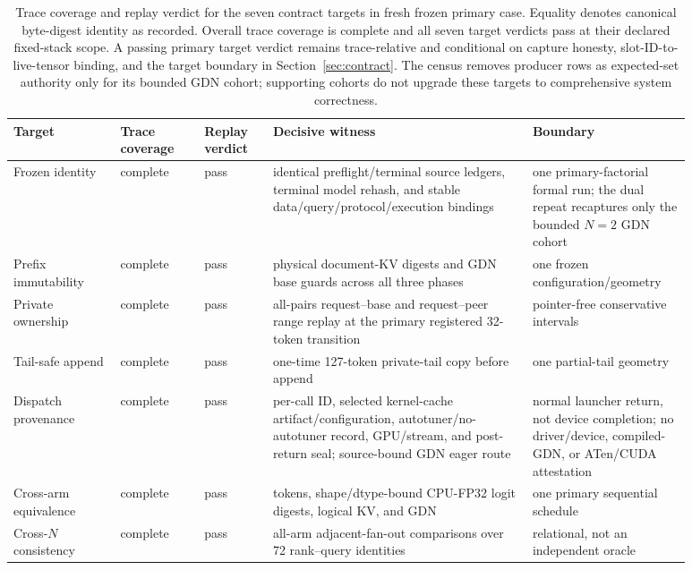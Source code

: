 \documentclass{article}
\begin{document}
\begin{table}[H]
  \caption{Trace coverage and replay verdict for the seven contract targets in
  fresh frozen primary case.  Equality denotes canonical byte-digest identity
  as recorded.  Overall trace coverage is complete and all seven target
  verdicts pass at their declared fixed-stack scope.  A passing primary
  target verdict remains trace-relative and conditional on capture honesty,
  slot-ID-to-live-tensor binding, and the target boundary in Section~\ref{sec:contract}.
  The census removes producer rows as expected-set authority only for its bounded
  GDN cohort; supporting cohorts do not upgrade these targets to comprehensive
  system correctness.}
  \label{tab:witness}
  \centering
  \scriptsize
  \begin{tabular}{@{}>{\raggedright\arraybackslash}p{0.14\linewidth}p{0.11\linewidth}p{0.09\linewidth}>{\raggedright\arraybackslash}p{0.34\linewidth}>{\raggedright\arraybackslash}p{0.20\linewidth}@{}}
    \toprule
    Target & Trace coverage & Replay verdict & Decisive witness & Boundary \\
    \midrule
    Frozen identity & complete & pass & identical preflight/terminal source ledgers, terminal model rehash, and stable data/query/protocol/execution bindings & one primary-factorial formal run; the dual repeat recaptures only the bounded $N=2$ GDN cohort \\
    Prefix immutability & complete & pass & physical document-KV digests and GDN base guards across all three phases & one frozen configuration/geometry \\
    Private ownership & complete & pass & all-pairs request--base and request--peer range replay at the primary registered 32-token transition & pointer-free conservative intervals \\
    Tail-safe append & complete & pass & one-time 127-token private-tail copy before append & one partial-tail geometry \\
    Dispatch provenance & complete & pass & per-call ID, selected kernel-cache artifact/configuration, autotuner/no-autotuner record, GPU/stream, and post-return seal; source-bound GDN eager route & normal launcher return, not device completion; no driver/device, compiled-GDN, or ATen/CUDA attestation \\
    Cross-arm equivalence & complete & pass & tokens, shape/dtype-bound CPU-FP32 logit digests, logical KV, and GDN & one primary sequential schedule \\
    Cross-$N$ consistency & complete & pass & 288 all-arm adjacent-fan-out comparisons over 72 rank--query identities & relational, not an independent oracle \\
    \bottomrule
  \end{tabular}
\end{table}
\end{document}
